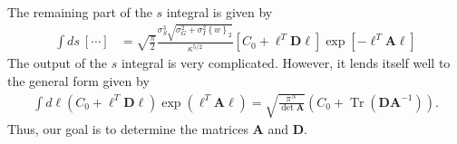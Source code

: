 \documentclass[11pt]{article}
\DeclareMathOperator{\Tr}{Tr}
\begin{document}
The remaining part of the $s$ integral is given by
\begin{align}
\int ds  \ [\cdots] &= \sqrt{\frac{\pi}{2}} \frac{\sigma_S^3 \sqrt{\sigma_G^2 +\sigma_I^2 \left\{w\right\}_2}}{\kappa^{5/2}} \left[C_0 + \boldsymbol{\ell}^T \mathbf{D} \boldsymbol{\ell}\right] \exp\left[-\boldsymbol{\ell}^T \mathbf{A} \boldsymbol{\ell}\right]
\end{align}
The output of the $s$ integral is very complicated. However, it lends itself well to the general form given by
\begin{align}
	\int d\boldsymbol{\ell} \left(C_0 +\boldsymbol{\ell}^T \mathbf{D} \boldsymbol{\ell}\right)\exp\left(\boldsymbol{\ell}^T \mathbf{A} \boldsymbol{\ell}\right) = \sqrt{\frac{\pi^N}{\det \mathbf{A}}}\left(C_0 + \Tr\left(\mathbf{D}\mathbf{A}^{-1}\right)\right).
\end{align}
Thus, our goal is to determine the matrices $\mathbf{A}$ and $\mathbf{D}$. 
\end{document}
